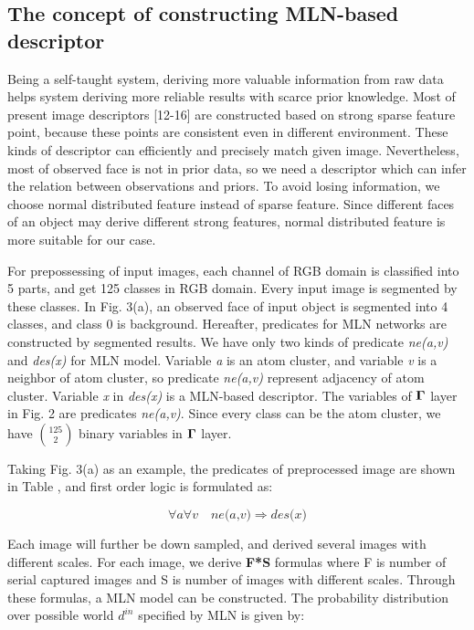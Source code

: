 \documentclass[journal]{IEEEtran}
\begin{document}
\subsection{The concept of constructing MLN-based descriptor}
Being a self-taught system, deriving more valuable information from raw data helps system deriving more reliable results with scarce prior knowledge. Most of present image descriptors [12-16] are constructed based on strong sparse feature point, because these points are consistent even in different environment. These kinds of descriptor can efficiently and precisely match given image. Nevertheless, most of observed face is not in prior data, so we need a descriptor which can infer the relation between observations and priors. To avoid losing information, we choose normal distributed feature instead of sparse feature. Since different faces of an object may derive different strong features, normal distributed feature is more suitable for our case. 

For prepossessing of input images, each channel of RGB domain is classified into 5 parts, and get 125 classes in RGB domain. Every input image is segmented by these classes. In Fig. 3(a), an observed face of input object is segmented into 4 classes, and class 0 is background. Hereafter, predicates for MLN networks are constructed by segmented results. We have only two kinds of predicate \textit{ne(a,v)} and  \textit{des(x)} for MLN model. Variable \textit{a} is an atom cluster, and variable \textit{v} is a neighbor of atom cluster, so predicate \textit{ne(a,v)} represent adjacency of atom cluster. Variable \textit{x} in \textit{des(x)} is a MLN-based descriptor. The variables of \textbf{$\bf\Gamma$} layer in Fig. 2 are predicates \textit{ne(a,v)}. Since every class can be the atom cluster, we have $\binom{125}{2}$ binary variables in \textbf{$\bf\Gamma$} layer.

Taking Fig. 3(a) as an example, the predicates of preprocessed image are shown in Table \uppercase\expandafter{}, and first order logic is formulated as:

\begin{equation}
\forall{a}\forall{v}\quad\textit{ne(a,v)}\Rightarrow\textit{des(x)}
\end{equation}

Each image will further be down sampled, and derived several images with different scales. For each image, we derive  \textbf{F*S} formulas where F is number of serial captured images and S is number of images with different scales. Through these formulas, a MLN model can be constructed. The probability distribution over possible world $d^{in}$ specified by MLN is given by:
\end{document}
